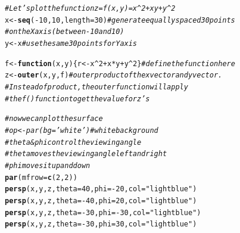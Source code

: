 \documentclass[conference,final,11pt,technote,onecolumn]{IEEEtran}\usepackage[]{graphicx}\usepackage[]{color}
\makeatletter
\newcommand{\hlnum}[1]{\textcolor[rgb]{0.686,0.059,0.569}{#1}}%
\newcommand{\hlstr}[1]{\textcolor[rgb]{0.192,0.494,0.8}{#1}}%
\newcommand{\hlcom}[1]{\textcolor[rgb]{0.678,0.584,0.686}{\textit{#1}}}%
\newcommand{\hlopt}[1]{\textcolor[rgb]{0,0,0}{#1}}%
\newcommand{\hlstd}[1]{\textcolor[rgb]{0.345,0.345,0.345}{#1}}%
\newcommand{\hlkwa}[1]{\textcolor[rgb]{0.161,0.373,0.58}{\textbf{#1}}}%
\newcommand{\hlkwb}[1]{\textcolor[rgb]{0.69,0.353,0.396}{#1}}%
\newcommand{\hlkwc}[1]{\textcolor[rgb]{0.333,0.667,0.333}{#1}}%
\newcommand{\hlkwd}[1]{\textcolor[rgb]{0.737,0.353,0.396}{\textbf{#1}}}%
\newenvironment{kframe}{%
 \def\at@end@of@kframe{}%
 \ifinner\ifhmode%
  \def\at@end@of@kframe{\end{minipage}}%
  \begin{minipage}{\columnwidth}%
 \fi\fi%
 \def\FrameCommand##1{\hskip\@totalleftmargin \hskip-\fboxsep
 \colorbox{shadecolor}{##1}\hskip-\fboxsep
     \hskip-\linewidth \hskip-\@totalleftmargin \hskip\columnwidth}%
 \MakeFramed {\advance\hsize-\width
   \@totalleftmargin\z@ \linewidth\hsize
   \@setminipage}}%
 {\par\unskip\endMakeFramed%
 \at@end@of@kframe}
\newenvironment{knitrout}{}{} %
\makeatother
\begin{document}
\begin{knitrout}
\color{fgcolor}\begin{kframe}
\begin{alltt}
\hlcom{#Let's plot the function z = f(x,y) = x^2 + xy + y^2}
\hlstd{x} \hlkwb{<-} \hlkwd{seq}\hlstd{(}\hlopt{-}\hlnum{10}\hlstd{,}\hlnum{10}\hlstd{,}\hlkwc{length}\hlstd{=}\hlnum{30}\hlstd{)} \hlcom{#generate equally spaced 30 points }
                \hlcom{#on the X axis (between -10 and 10)}
\hlstd{y} \hlkwb{<-} \hlstd{x} \hlcom{#use the same 30 points for Y axis}

\hlstd{f} \hlkwb{<-} \hlkwa{function}\hlstd{(}\hlkwc{x}\hlstd{,}\hlkwc{y}\hlstd{)\{ r} \hlkwb{<-} \hlstd{x}\hlopt{^}\hlnum{2}\hlopt{+}\hlstd{x}\hlopt{*}\hlstd{y}\hlopt{+}\hlstd{y}\hlopt{^}\hlnum{2}\hlstd{\}} \hlcom{#define the function here}
\hlstd{z} \hlkwb{<-} \hlkwd{outer}\hlstd{(x,y,f)} \hlcom{#outer product of the x vector and y vector. }
                \hlcom{#Instead of product, the outer function will apply }
                \hlcom{#the f() function to get the value for z's}

\hlcom{#now we can plot the surface}
\hlcom{#op <- par(bg = 'white') #white background}
\hlcom{#theta & phi control the viewing angle}
        \hlcom{#theta moves the viewing angle left and right}
        \hlcom{#phi moves it up and down}
\hlkwd{par}\hlstd{(}\hlkwc{mfrow}\hlstd{=}\hlkwd{c}\hlstd{(}\hlnum{2}\hlstd{,}\hlnum{2}\hlstd{))}
\hlkwd{persp}\hlstd{(x,y,z,}\hlkwc{theta}\hlstd{=}\hlnum{40}\hlstd{,}\hlkwc{phi}\hlstd{=}\hlopt{-}\hlnum{20}\hlstd{,}\hlkwc{col}\hlstd{=}\hlstr{"lightblue"}\hlstd{)}
\hlkwd{persp}\hlstd{(x,y,z,}\hlkwc{theta}\hlstd{=}\hlopt{-}\hlnum{40}\hlstd{,}\hlkwc{phi}\hlstd{=}\hlnum{20}\hlstd{,}\hlkwc{col}\hlstd{=}\hlstr{"lightblue"}\hlstd{)}
\hlkwd{persp}\hlstd{(x,y,z,}\hlkwc{theta}\hlstd{=}\hlopt{-}\hlnum{30}\hlstd{,}\hlkwc{phi}\hlstd{=}\hlopt{-}\hlnum{30}\hlstd{,}\hlkwc{col}\hlstd{=}\hlstr{"lightblue"}\hlstd{)}
\hlkwd{persp}\hlstd{(x,y,z,}\hlkwc{theta}\hlstd{=}\hlopt{-}\hlnum{30}\hlstd{,}\hlkwc{phi}\hlstd{=}\hlnum{30}\hlstd{,}\hlkwc{col}\hlstd{=}\hlstr{"lightblue"}\hlstd{)}
\end{alltt}
\end{kframe}


\end{knitrout}
\end{document}
